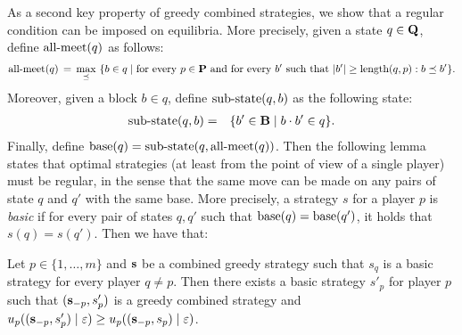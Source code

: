 %
%
%
%
%
%
%



As a second key property of greedy combined strategies, we show that a regular condition can be imposed on equilibria. More precisely, given a state $q \in \mathbf{Q}$, define $\text{\rm all-meet}(q)$ as follows:
\begin{multline*}
\text{\rm all-meet}(q)  \, =  \, \max_{\preceq} \ \{b \in q \mid \text{for every } p\in \mathbf{P} \text{ and for every } b' \text{ such that } |b'| \geq \text{\rm length}(q,p): b \preceq b'\}. 
\end{multline*}
Moreover, given a block $b \in q$, define ${\text{\rm sub-state}}(q,b)$ as the following state:
\begin{eqnarray*}
{\text{\rm sub-state}}(q,b) & = & \{ b' \in \mathbf{B} \mid b \cdot b' \in q\}.
\end{eqnarray*}
Finally, define $\text{\rm base}(q) = {\text{\rm sub-state}}(q,\text{\rm all-meet}(q))$.
Then the following lemma states that optimal strategies (at least from the point of view of a single player) must be regular, in the sense that the same move can be made on any pairs of state $q$ and $q'$ with the same base. More precisely, 
a strategy $s$ for a player $p$ is \emph{basic} if for every pair of states $q, q'$ such that $\text{\rm base}(q) = \text{\rm base}(q')$, it holds that $s(q) = s(q')$. Then we have that:
\begin{mylem}
\label{lem-basic}
Let $p \in \{1, \ldots, m\}$ and $\mathbf{s}$ be a combined greedy strategy such that $s_q$ is a basic strategy for every player $q \neq p$. Then there exists a basic strategy $s'_p$ for player $p$ such that $(\mathbf{s}_{-p}, s'_p)$ is a greedy combined strategy and $u_p((\mathbf{s}_{-p},s'_p) \mid \varepsilon) \geq u_p((\mathbf{s}_{-p},s_p) \mid \varepsilon)$.
\end{mylem}

